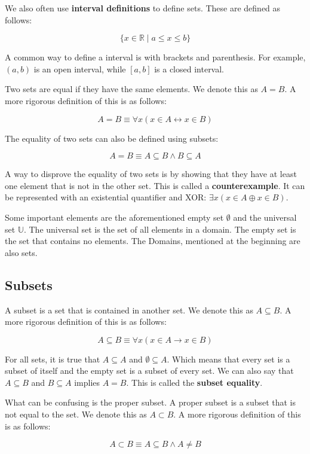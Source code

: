 \documentclass[11pt]{article}
\begin{document}
We also often use \textbf{interval definitions} to define sets. These are defined as follows:

\[
\{x \in \mathbb{R} \mid a \leq x \leq b\}
\]

A common way to define a interval is with brackets and parenthesis. For example, \((a,b)\) is an open interval, while \([a,b]\) is a closed interval.

Two sets are equal if they have the same elements. We denote this as \(A = B\). A more rigorous definition of this is as follows:

\[
A = B \equiv \forall x (x \in A \leftrightarrow x \in B)
\]

The equality of two sets can also be defined using subsets:

\[
A = B \equiv A \subseteq B \land B \subseteq A
\]

A way to disprove the equality of two sets is by showing that they have at least one element that is not in the other set. This is called a \textbf{counterexample}. It can be represented with an existential quantifier and XOR: \(\exists x (x \in A \oplus x \in B)\).

Some important elements are the aforementioned empty set \(\emptyset\) and the universal set \(\mathbb{U}\). The universal set is the set of all elements in a domain. The empty set is the set that contains no elements. The Domains, mentioned at the beginning are also sets.

\subsection{Subsets}
\label{sec:orgd0bf5e0}
A subset is a set that is contained in another set. We denote this as \(A \subseteq B\). A more rigorous definition of this is as follows:

\[
A \subseteq B \equiv \forall x (x \in A \to x \in B)
\]

For all sets, it is true that \(A \subseteq A\) and \(\emptyset \subseteq A\). Which means that every set is a subset of itself and the empty set is a subset of every set. We can also say that \(A \subseteq B\) and \(B \subseteq A\) implies \(A = B\). This is called the \textbf{subset equality}.

What can be confusing is the proper subset. A proper subset is a subset that is not equal to the set. We denote this as \(A \subset B\). A more rigorous definition of this is as follows:

\[
A \subset B \equiv A \subseteq B \land A \neq B
\]
\end{document}
